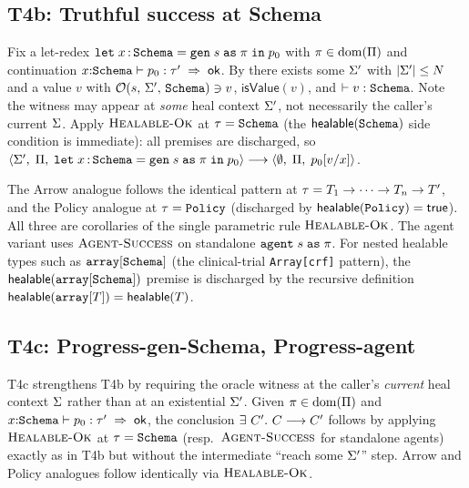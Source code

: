 \subsection{T4b: Truthful success at Schema}
\label{app:proof-prog-b}

\begin{sloppypar}
Fix a let-redex $\texttt{let}\; x\,{:}\,\texttt{Schema} = \texttt{gen}\;s\;\texttt{as}\;\pi\;\texttt{in}\;p_0$ with $\pi
\in \mathrm{dom}(\Pi)$ and continuation
$x {:} \texttt{Schema} \vdash p_0 : \tau' \;\Rightarrow\; \mathsf{ok}$. By  there
exists some $\Sigma'$ with $|\Sigma'| \le N$ and a value $v$ with
$\mathcal{O}(s,\,\Sigma',\,\texttt{Schema}) \ni v$, $\mathsf{isValue}(v)$, and
$\vdash v : \texttt{Schema}$. Note the witness may appear at \emph{some} heal context
$\Sigma'$, not necessarily the caller's current $\Sigma$. Apply
$\textsc{Healable-Ok}$ at $\tau = \texttt{Schema}$ (the $\mathsf{healable}(\texttt{Schema})$ side
condition is immediate): all premises are discharged, so
$\langle \Sigma',\; \Pi,\; \texttt{let}\; x\,{:}\,\texttt{Schema} = \texttt{gen}\;s\;\texttt{as}\;\pi\;\texttt{in}\;p_0 \rangle \longrightarrow
\langle \emptyset,\; \Pi,\; p_0[v/x] \rangle$.

The Arrow analogue follows the identical pattern at
$\tau = T_1 \to \cdots \to T_n \to T'$, and the Policy analogue at
$\tau = \texttt{Policy}$ (discharged by $\mathsf{healable}(\texttt{Policy}) = \mathsf{true}$). All
three are corollaries of the single parametric rule $\textsc{Healable-Ok}$.
The agent variant uses $\textsc{Agent-Success}$ on standalone
$\texttt{agent}\;s\;\texttt{as}\;\pi$. For nested healable types such as $\texttt{array}[\texttt{Schema}]$ (the
clinical-trial \texttt{Array[crf]} pattern), the $\mathsf{healable}(\texttt{array}[\texttt{Schema}])$
premise is discharged by the recursive definition $\mathsf{healable}(\texttt{array}[T]) =
\mathsf{healable}(T)$.
\end{sloppypar}

\subsection{T4c: Progress-gen-Schema, Progress-agent}
\label{app:proof-prog-c}

\begin{sloppypar}
T4c strengthens T4b by requiring the oracle witness at the caller's
\emph{current} heal context $\Sigma$ rather than at an existential $\Sigma'$.
Given $\pi \in \mathrm{dom}(\Pi)$ and
$x {:} \texttt{Schema} \vdash p_0 : \tau' \;\Rightarrow\; \mathsf{ok}$, the conclusion $\exists~C'.\ C \longrightarrow
C'$ follows by applying $\textsc{Healable-Ok}$ at $\tau = \texttt{Schema}$ (resp.\
$\textsc{Agent-Success}$ for standalone agents) exactly as in T4b but without
the intermediate ``reach some $\Sigma'$'' step. Arrow and Policy analogues
follow identically via $\textsc{Healable-Ok}$.
\end{sloppypar}


